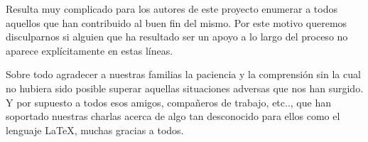 Resulta muy complicado para los autores de este proyecto enumerar a todos aquellos que han contribuido al buen fin del mismo. Por este motivo queremos disculparnos si alguien que ha resultado ser un apoyo a lo largo del proceso no aparece explícitamente en estas líneas.

Sobre todo agradecer a nuestras familias la paciencia y la comprensión sin la cual no hubiera sido posible superar aquellas situaciones adversas que nos han surgido.
Y por supuesto a todos esos amigos, compañeros de trabajo, etc.., que han soportado nuestras charlas acerca de algo tan desconocido para ellos como el lenguaje \LaTeX{}, muchas gracias a todos.



